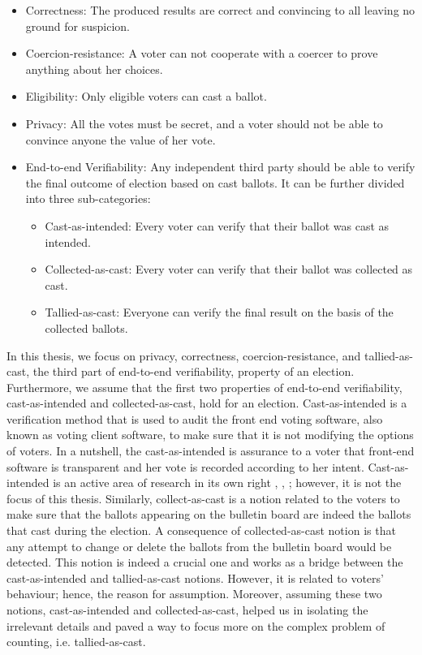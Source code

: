  \begin{itemize}
 
  \item Correctness:
 	The produced results are correct and convincing to all leaving no  ground for suspicion. 

 \item Coercion-resistance: A voter can not cooperate with a coercer to prove anything about her choices.
 
 \item Eligibility: Only eligible voters can cast a ballot.
 	
 \item Privacy:
    All the votes must be secret, and a voter should not be able to convince anyone the 
    value of her vote.
 
 \item End-to-end Verifiability:
 Any independent third party should be able to verify the final outcome of election based on cast 
 ballots.  It can be further divided into three sub-categories:
 
 \begin{itemize}
  \item Cast-as-intended: Every voter can verify that their ballot was cast as
  intended.
  \item Collected-as-cast: Every voter can verify that their ballot was collected as
  cast.
  \item Tallied-as-cast: Everyone can verify the final result on the basis of the
  collected ballots.
\end{itemize}
\end{itemize}
	

In this thesis, we focus on privacy, correctness, coercion-resistance, and tallied-as-cast, the third part of end-to-end verifiability, property 
of an election. Furthermore, we assume that the first two properties of end-to-end verifiability, cast-as-intended and 
collected-as-cast, hold for an election. Cast-as-intended is a verification method that is used to audit the 
front end voting software, 
also known as voting client software, to make sure that it is not modifying the options of voters. In a nutshell, 
the cast-as-intended is assurance to a voter that front-end software is transparent and her vote 
is recorded according to her intent.  Cast-as-intended is an active area of research in its own right \citep{10.1007/978-3-319-22270-7_1},  \citep{mci/Marky2018},  \citep{cortier:hal-02346420}; 
however, it is not the focus of this thesis. Similarly,  collect-as-cast is a notion related to the voters to make 
sure that the ballots appearing on the bulletin board are indeed the ballots that cast during the election. A consequence 
of collected-as-cast notion is that any attempt to change or delete the ballots from the bulletin board would 
be detected. This notion is indeed a crucial one and works as a bridge between the cast-as-intended and tallied-as-cast 
notions. However, it is related to voters' behaviour; hence, the reason for assumption.  Moreover, assuming these two 
notions, cast-as-intended and collected-as-cast, helped us in isolating the irrelevant details and 
paved a way to focus more on the complex problem of counting, i.e. tallied-as-cast. 


